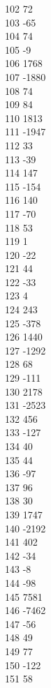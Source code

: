 { 102	72 \\
 103	-65 \\
 104	74 \\
 105	-9 \\
 106	1768 \\
 107	-1880 \\
 108	74 \\
 109	84 \\
 110	1813 \\
 111	-1947 \\
 112	33 \\
 113	-39 \\
 114	147 \\
 115	-154 \\
 116	140 \\
 117	-70 \\
 118	53 \\
 119	1 \\
 120	-22 \\
 121	44 \\
 122	-33 \\
 123	4 \\
 124	243 \\
 125	-378 \\
 126	1440 \\
 127	-1292 \\
 128	68 \\
 129	-111 \\
 130	2178 \\
 131	-2523 \\
 132	456 \\
 133	-127 \\
 134	40 \\
 135	44 \\
 136	-97 \\
 137	96 \\
 138	30 \\
 139	1747 \\
 140	-2192 \\
 141	402 \\
 142	-34 \\
 143	-8 \\
 144	-98 \\
 145	7581 \\
 146	-7462 \\
 147	-56 \\
 148	49 \\
 149	77 \\
 150	-122 \\
 151	58 \\
}
